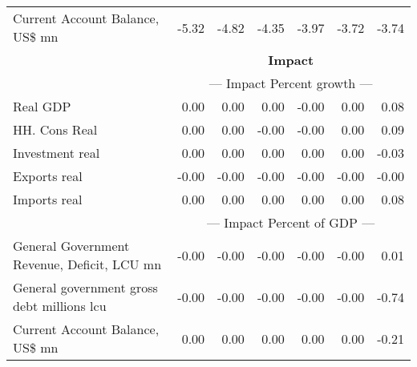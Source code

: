 \documentclass{article}
\begin{document}
\begin{table}[ht]
\begin{tabular}{lrrrrr|r}
Current Account Balance, US\$ mn & -5.32 & -4.82 & -4.35 & -3.97 & -3.72 & -3.74 \\
&\multicolumn{6}{c}{{\large \textbf{Impact}}}                               \\
&\multicolumn{6}{c}{{--- Impact Percent growth ---}}                               \\
Real GDP & 0.00 & 0.00 & 0.00 & -0.00 & 0.00 & 0.08 \\
HH. Cons Real & 0.00 & 0.00 & -0.00 & -0.00 & 0.00 & 0.09 \\
Investment real & 0.00 & 0.00 & 0.00 & 0.00 & 0.00 & -0.03 \\
Exports real & -0.00 & -0.00 & -0.00 & -0.00 & -0.00 & -0.00 \\
Imports real & 0.00 & 0.00 & 0.00 & 0.00 & 0.00 & 0.08 \\
&\multicolumn{6}{c}{{--- Impact Percent of GDP ---}}                               \\
General Government Revenue, Deficit, LCU mn & -0.00 & -0.00 & -0.00 & -0.00 & -0.00 & 0.01 \\
General government gross debt millions lcu & -0.00 & -0.00 & -0.00 & -0.00 & -0.00 & -0.74 \\
Current Account Balance, US\$ mn & 0.00 & 0.00 & 0.00 & 0.00 & 0.00 & -0.21 \\
\bottomrule
\end{tabular}
\end{table}
\end{document}
